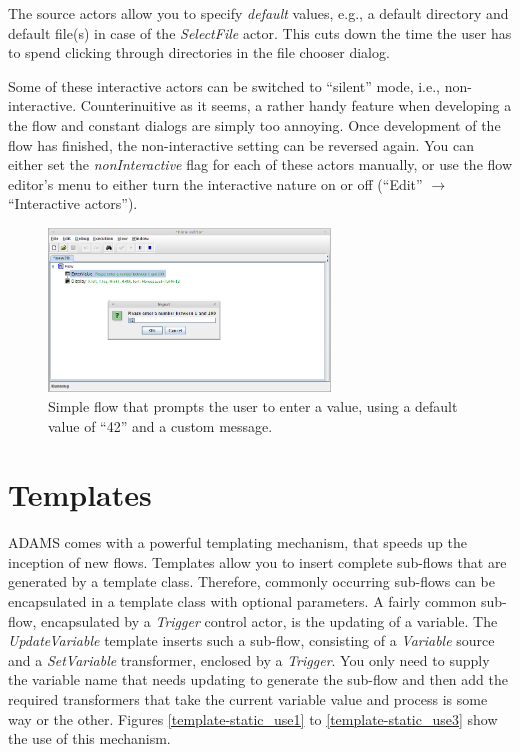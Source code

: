 The source actors allow you to specify \textit{default} values, e.g., a
default directory and default file(s) in case of the \textit{SelectFile} actor.
This cuts down the time the user has to spend clicking through directories in
the file chooser dialog.

Some of these interactive actors can be switched to ``silent'' mode, i.e.,
non-interactive. Counterinuitive as it seems, a rather handy feature when
developing a the flow and constant dialogs are simply too annoying. Once
development of the flow has finished, the non-interactive setting can be
reversed again. You can either set the \textit{nonInteractive} flag for each of
these actors manually, or use the flow editor's menu to either turn the
interactive nature on or off (``Edit'' $\rightarrow$ ``Interactive actors'').

\begin{figure}[htb]
  \centering
  \includegraphics[width=7.5cm]{images/floweditor-interactive_actors1.png}
  \caption{Simple flow that prompts the user to enter a value, using a default
  value of ``42'' and a custom message.}
  \label{floweditor-interactive_actors1}
\end{figure}

\newpage
\section{Templates}
\label{templates}
ADAMS comes with a powerful templating mechanism, that speeds up the
inception of new flows. Templates allow you to insert complete sub-flows
that are generated by a template class. Therefore, commonly occurring sub-flows
can be encapsulated in a template class with optional parameters. A fairly
common sub-flow, encapsulated by a \textit{Trigger} control actor, is the
updating of a variable. The \textit{UpdateVariable} template inserts such a
sub-flow, consisting of a \textit{Variable} source and a \textit{SetVariable}
transformer, enclosed by a \textit{Trigger}. You only need to supply the
variable name that needs updating to generate the sub-flow and then add the
required transformers that take the current variable value and process is some
way or the other. Figures \ref{template-static_use1} to
\ref{template-static_use3} show the use of this mechanism.

